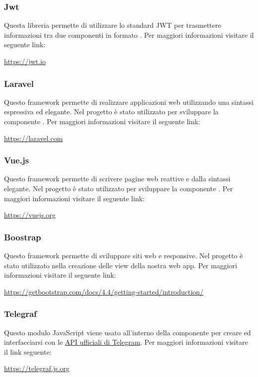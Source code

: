 		\subsubsection{Jwt}
			Questa libreria permette di utilizzare lo standard JWT per trasmettere informazioni tra due componenti in formato .
			\newline
			Per maggiori informazioni visitare il seguente link:
			\newline
			\begin{center}
				\url{https://jwt.io}
			\end{center}
		\subsubsection{Laravel}
			Questo framework permette di realizzare applicazioni web utilizzando una sintassi espressiva ed elegante. Nel progetto è stato utilizzato per sviluppare la componente .
			\newline
			Per maggiori informazioni visitare il seguente link:
			\newline
			\begin{center}
				\url{https://laravel.com}
			\end{center}
		\subsubsection{Vue.js}
			Questo framework permette di scrivere pagine web reattive e dalla sintassi elegante. Nel progetto è stato utilizzato per sviluppare la componente .
			\newline
			Per maggiori informazioni visitare il seguente link:
			\newline
			\begin{center}
				\url{https://vuejs.org}
			\end{center}
		\subsubsection{Boostrap}
			Questo framework permette di sviluppare siti web e  responsive. Nel progetto è stato utilizzato nella creazione delle view della nostra web app.
			\newline
			Per maggiori informazioni visitare il seguente link:
			\newline
			\begin{center}
				\url{https://getbootstrap.com/docs/4.4/getting-started/introduction/}
			\end{center}	
		\subsubsection{Telegraf}
			Questo modulo JavaScript viene usato all'interno della componente  per creare ed interfacciarsi con le \href{https://core.telegram.org/bots/api}{API ufficiali di Telegram}.
			\newline
			Per maggiori informazioni visitare il link seguente:
			\newline
			\begin{center}
				\url{https://telegraf.js.org}
			\end{center}
	